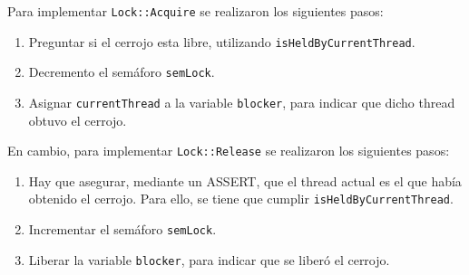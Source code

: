 Para implementar \texttt{Lock::Acquire} se realizaron los siguientes pasos:
\begin{enumerate}
	\item Preguntar si el cerrojo esta libre, utilizando \texttt{isHeldByCurrentThread}.
	\item Decremento el semáforo \texttt{semLock}.
	\item Asignar \texttt{currentThread} a la variable \texttt{blocker}, para indicar que dicho thread obtuvo el cerrojo.
\end{enumerate}
En cambio, para implementar \texttt{Lock::Release} se realizaron los siguientes pasos:
\begin{enumerate}
	\item Hay que asegurar, mediante un ASSERT, que el thread actual es el que había obtenido el cerrojo. Para ello, se tiene que cumplir \texttt{isHeldByCurrentThread}.
	\item Incrementar el semáforo \texttt{semLock}.
	\item Liberar la variable \texttt{blocker}, para indicar que se liberó el cerrojo.
\end{enumerate}
